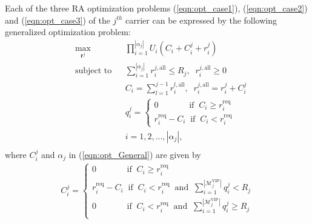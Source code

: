 \documentclass[journal]{IEEEtran} 				\IEEEoverridecommandlockouts 						\usepackage{amsmath,amssymb}
\begin{document}
Each of the three RA optimization problems (\ref{eqn:opt_case1}), (\ref{eqn:opt_case2}) and (\ref{eqn:opt_case3}) of the $j^{th}$ carrier can be expressed by the following generalized optimization problem:
\begin{equation}\label{eqn:opt_General}
\begin{aligned}
& \underset{\textbf{r}^j}{\text{max}}
& & \prod_{i=1}^{|\alpha_j|}U_i(C_i+C_i^j+r_i^j) \\
& \text{subject to}
& & \sum_{i=1}^{|\alpha_j|}r_i^{j,\text{all}} \leq R_j,\;\;r_i^{j,\text{all}} \geq 0\\
& & & C_i=\sum_{l=1}^{j-1}r_i^{l,\text{all}},\;\;r_i^{j,\text{all}}=r_i^j+C_i^j\\
& & & q_i^j=
\begin{cases}
	0 \;\;\;\;\;\;\;\;\;\;\;\;\; \text{if}\;\; C_i \geq r_i^{\text{req}}\\
	r_i^{\text{req}}-C_i \;\;\text{if}\;\; C_i < r_i^{\text{req}}
\end{cases}\\
& & & i = 1,2, ...,|\alpha_j|,\\
\end{aligned}
\end{equation}
where $C_i^j$ and $\alpha_j$ in (\ref{eqn:opt_General}) are given by
\begin{align*}
C_i^j=
\begin{cases}
	0 \;\;\;\;\;\;\;\;\;\;\;\;\; \text{if}\;\; C_i \geq r_i^{\text{req}}\\
	r_i^{\text{req}}-C_i \;\;\text{if}\;\; C_i < r_i^{\text{req}}\;\;\text{and}\;\;\sum_{i=1}^{|\mathcal{M}_j^{\text{VIP}}|}q_i^j < R_j\\
    0 \;\;\;\;\;\;\;\;\;\;\;\;\; \text{if}\;\; C_i < r_i^{\text{req}}\;\;\text{and}\;\;\sum_{i=1}^{|\mathcal{M}_j^{\text{VIP}}|}q_i^j \geq R_j\\
\end{cases}\\
\end{align*}
\end{document}
